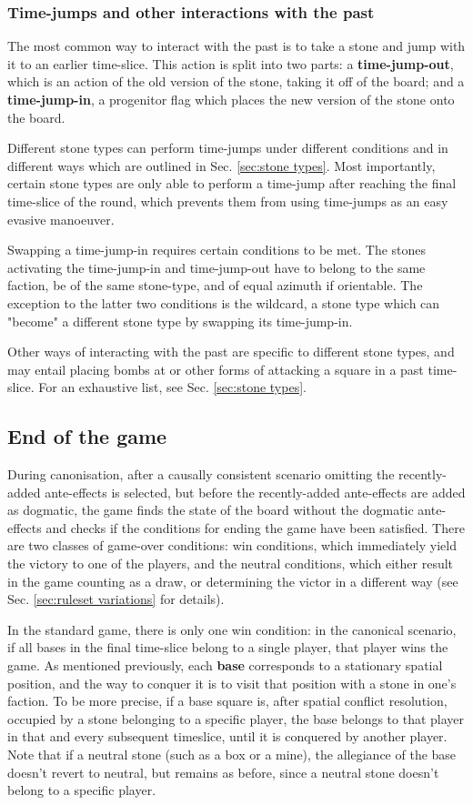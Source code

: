 \documentclass[12pt]{article}
\begin{document}
	\subsubsection{Time-jumps and other interactions with the past} \label{sec:timejumps}
	The most common way to interact with the past is to take a stone and jump with it to an earlier time-slice. This action is split into two parts: a \textbf{time-jump-out}, which is an action of the old version of the stone, taking it off of the board; and a \textbf{time-jump-in}, a progenitor flag which places the new version of the stone onto the board.
	
	Different stone types can perform time-jumps under different conditions and in different ways which are outlined in Sec. \ref{sec:stone types}. Most importantly, certain stone types are only able to perform a time-jump after reaching the final time-slice of the round, which prevents them from using time-jumps as an easy evasive manoeuver.
	
	Swapping a time-jump-in requires certain conditions to be met. The stones activating the time-jump-in and time-jump-out have to belong to the same faction, be of the same stone-type, and of equal azimuth if orientable. The exception to the latter two conditions is the wildcard, a stone type which can "become" a different stone type by swapping its time-jump-in.
	
	Other ways of interacting with the past are specific to different stone types, and may entail placing bombs at or other forms of attacking a square in a past time-slice. For an exhaustive list, see Sec. \ref{sec:stone types}.
	
	\subsection{End of the game}
	During canonisation, after a causally consistent scenario omitting the recently-added ante-effects is selected, but before the recently-added ante-effects are added as dogmatic, the game finds the state of the board without the dogmatic ante-effects and checks if the conditions for ending the game have been satisfied. There are two classes of game-over conditions: win conditions, which immediately yield the victory to one of the players, and the neutral conditions, which either result in the game counting as a draw, or determining the victor in a different way (see Sec. \ref{sec:ruleset variations} for details).
	
	In the standard game, there is only one win condition: in the canonical scenario, if all bases in the final time-slice belong to a single player, that player wins the game. As mentioned previously, each \textbf{base} corresponds to a stationary spatial position, and the way to conquer it is to visit that position with a stone in one's faction. To be more precise, if a base square is, after spatial conflict resolution, occupied by a stone belonging to a specific player, the base belongs to that player in that and every subsequent timeslice, until it is conquered by another player. Note that if a neutral stone (such as a box or a mine), the allegiance of the base doesn't revert to neutral, but remains as before, since a neutral stone doesn't belong to a specific player.
	
\end{document}
